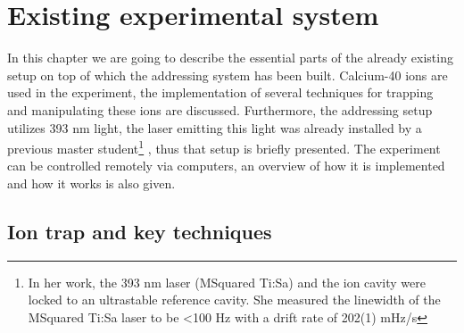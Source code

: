 
\chapter{Existing experimental system}
In this chapter we are going to describe the essential parts of the already existing setup on top of which the addressing system has been built. Calcium-40 ions are used in the experiment, the implementation of several techniques for trapping and manipulating these ions are discussed. Furthermore, the addressing setup utilizes 393 nm light, the laser emitting this light was already installed by a previous master student\footnote{In her work, the 393 nm laser (MSquared Ti:Sa) and the ion cavity were locked to an ultrastable reference cavity. She measured the linewidth of the MSquared Ti:Sa laser to be <100 Hz with a drift rate of 202(1) mHz/s} \cite{helene}, thus that setup is briefly presented. The experiment can be controlled remotely via computers, an overview of how it is implemented and how it works is also given.

\section{Ion trap and key techniques}
